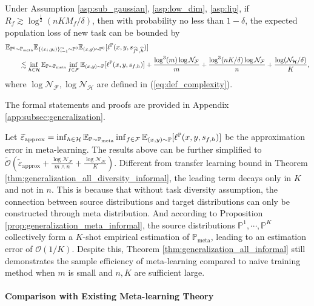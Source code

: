 \documentclass[11pt]{article}
\numberwithin{equation}{section}
\newcommand{\Pmeta}{\mathbb{P}_{\text{meta}}}
\renewcommand{\P}{\mathbb{P}}
\renewcommand{\eqref}[1]{(\ref{#1})}
\begin{document}
\begin{thm}\label{thm:generalization_all_informal}
    Under Assumption \ref{asp:sub_gaussian}, \ref{asp:low_dim}, \ref{asp:lip},
    if $R_f\gtrsim\log^{\frac{1}{2}}(nKM_f/\delta)$,
    then with probability no less than $1-\delta$, the expected population loss of new task can be bounded by
    \begin{equation}
        \begin{aligned}
            &\E_{\P^0\sim\Pmeta}\E_{\{(x_i,y_i)\}_{i=1}^m\sim \P^0} \E_{(x,y)\sim\P^0} [\ell^\P(x,y,s_{\widehat{f}^0,\widehat{h}})] \\
            &\qquad \lesssim \inf_{h\in\mathcal{H}} \E_{\P\sim\Pmeta} \inf_{f\in\mathcal{F}}\E_{(x,y)\sim\P} [\ell^\P (x,y,s_{f,h})] + \frac{\log^3(m)\log\mathcal{N}_\mathcal{F}}{m} + \frac{\log^3(nK/\delta)\log\mathcal{N}_\mathcal{F}}{n}+\frac{\log(\mathcal{N}_\mathcal{H}/\delta)}{K},
        \end{aligned}
    \end{equation}
    where $\log\mathcal{N}_\mathcal{F},\log\mathcal{N}_\mathcal{H}$ are defined in \eqref{eq:def_complexity}.
\end{thm}
The formal statements and proofs are provided in Appendix \ref{app:subsec:generalization}.

Let $\widetilde{\varepsilon}_{\text{approx}}=\inf_{h\in\mathcal{H}} \E_{\P\sim\Pmeta} \inf_{f\in\mathcal{F}}\E_{(x,y)\sim\P} [\ell^\P (x,y,s_{f,h})]$ be the approximation error in meta-learning.
The results above can be further simplified to $\widetilde{\mathcal{O}}\left(\widetilde{\varepsilon}_{\text{approx}}+\frac{\log\mathcal{N}_\mathcal{F}}{m\wedge n}+\frac{\log\mathcal{N}_\mathcal{H}}{K}\right)$. Different from transfer learning bound in Theorem \ref{thm:generalization_all_diversity_informal}, the leading term decays only in $K$ and not in $n$.
This is because that without task diversity assumption, the connection between source distributions and target distributions can only be constructed through meta distribution. 
And according to Proposition \ref{prop:generalization_meta_informal}, the source distributions $\P^1,\cdots,\P^K$ collectively form a $K$-shot empirical estimation of $\Pmeta$, leading to an estimation error of $\mathcal{O}(1/K)$. Despite this, Theorem \ref{thm:generalization_all_informal} still demonstrates the sample efficiency of meta-learning compared to naive training method when $m$ is small and $n,K$ are sufficient large. 

\paragraph{Comparison with Existing Meta-learning Theory}
\end{document}
